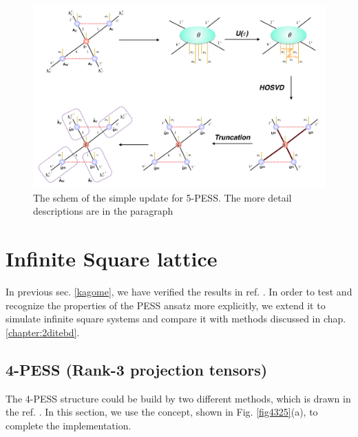 \begin{figure}[ht]
	\centering
	\includegraphics[width=1.00\textwidth]{figures/fig4324.png}
	\caption[The schem of the simple update for 5-PESS.]{The schem of the simple update for 5-PESS. The more detail descriptions are in the paragraph}
	\label{fig4324}
\end{figure}
\section{Infinite Square lattice}
\label{4pess2b}
In previous sec. \ref{kagome}, we have verified the results in ref. \cite{} \cite{}. In order to test and recognize the properties of the PESS ansatz more explicitly, we extend it to simulate infinite square systems and compare it with methods discussed in chap. \ref{chapter:2ditebd}.
\subsection{4-PESS (Rank-3 projection tensors)}
The 4-PESS structure could be build by two different methods, which is drawn in the ref. \cite{}. In this section, we use the concept, shown in Fig. \ref{fig4325}(a), to complete the implementation. 

